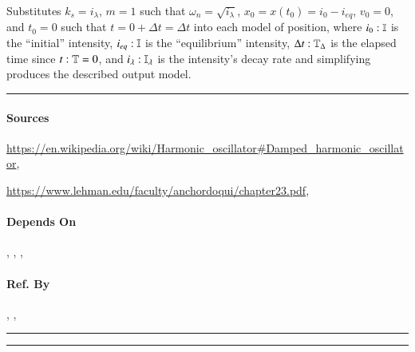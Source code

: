 Substitutes $k_s = i_\lambda$, $m = 1$ such that $\omega_n = \sqrt{i_\lambda}$,
$x_0 = x\left(t_0\right) = i_0 - i_{eq}$, $v_0 = 0$, and $t_0 = 0$ such that $t
= 0 + \Delta t = \Delta t$ into each model of position, where $i_0 :
\mathbb{I}$ is the ``initial'' intensity, $i_{eq} :
\mathbb{I}$ is the ``equilibrium'' intensity, $\Delta t :
\mathbb{T}_{\Delta}$ is the elapsed time since $t : \mathbb{T} = 0$, and $i_\lambda :
\mathbb{I_{\lambda}}$ is the intensity's decay rate and simplifying produces the
described output model. \\\hrule

\paragraph{Sources}
{\small\url{https://en.wikipedia.org/wiki/Harmonic_oscillator#Damped_harmonic_oscillator},

    \url{https://www.lehman.edu/faculty/anchordoqui/chapter23.pdf},
    \cite{alexiou2013solution}}

\paragraph{Depends On} , ,
, 

\paragraph{Ref. By} , ,
 \\\hrule\vspace{0.5mm}\hrule

~\newline

